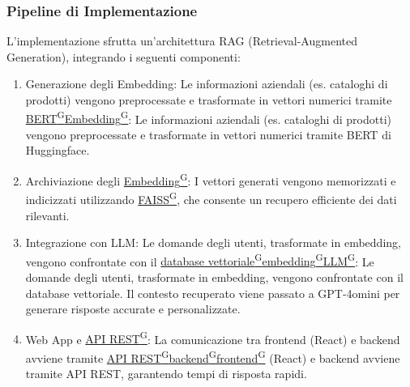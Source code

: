 \subsubsection{Pipeline di Implementazione}
L'implementazione sfrutta un'architettura RAG (Retrieval-Augmented Generation), integrando i seguenti componenti:
\begin{enumerate}
    \item Generazione degli Embedding: Le informazioni aziendali (es. cataloghi di prodotti) vengono preprocessate e trasformate in vettori numerici tramite \href{https://code7crusaders.github.io/docs/RTB/documentazione_interna/glossario.html#bert-bidirectional-encoder-representations-from-transformers}{BERT\textsuperscript{G}}\href{https://code7crusaders.github.io/docs/RTB/documentazione_interna/glossario.html#embedding}{Embedding\textsuperscript{G}}: Le informazioni aziendali (es. cataloghi di prodotti) vengono preprocessate e trasformate in vettori numerici tramite BERT di Huggingface.
    \item Archiviazione degli \href{https://code7crusaders.github.io/docs/RTB/documentazione_interna/glossario.html#embedding}{Embedding\textsuperscript{G}}: I vettori generati vengono memorizzati e indicizzati utilizzando \href{https://code7crusaders.github.io/docs/RTB/documentazione_interna/glossario.html#faiss}{FAISS\textsuperscript{G}}, che consente un recupero efficiente dei dati rilevanti.
    \item Integrazione con LLM: Le domande degli utenti, trasformate in embedding, vengono confrontate con il \href{https://code7crusaders.github.io/docs/RTB/documentazione_interna/glossario.html#database-vettoriale}{database vettoriale\textsuperscript{G}}\href{https://code7crusaders.github.io/docs/RTB/documentazione_interna/glossario.html#embedding}{embedding\textsuperscript{G}}\href{https://code7crusaders.github.io/docs/RTB/documentazione_interna/glossario.html#llm-large-language-model}{LLM\textsuperscript{G}}: Le domande degli utenti, trasformate in embedding, vengono confrontate con il database vettoriale. Il contesto recuperato viene passato a GPT-4omini per generare risposte accurate e personalizzate.
    \item Web App e \href{https://code7crusaders.github.io/docs/RTB/documentazione_interna/glossario.html#api-rest-representational-state-transfer}{API REST\textsuperscript{G}}: La comunicazione tra frontend (React) e backend avviene tramite \href{https://code7crusaders.github.io/docs/RTB/documentazione_interna/glossario.html#api-rest-representational-state-transfer}{API REST\textsuperscript{G}}\href{https://code7crusaders.github.io/docs/RTB/documentazione_interna/glossario.html#backend}{backend\textsuperscript{G}}\href{https://code7crusaders.github.io/docs/RTB/documentazione_interna/glossario.html#frontend}{frontend\textsuperscript{G}} (React) e backend avviene tramite API REST, garantendo tempi di risposta rapidi.
\end{enumerate}

